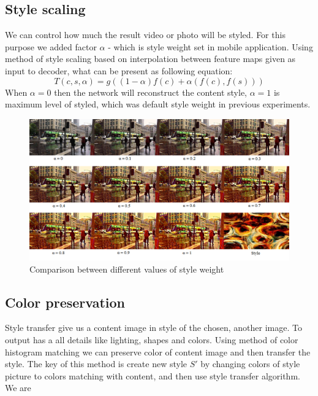 \documentclass[../Main.tex]{subfiles}
\begin{document}
\subsection{Style scaling}
We can control how much the result video or photo will be styled. For this purpose we added factor $\alpha$ -  which is style weight set in mobile application. Using method of style scaling based on interpolation between feature maps given as input to decoder, what can be present as following equation: $$T(c,s,\alpha) = g((1-\alpha)f(c)+\alpha (f(c),f(s)))$$ When $\alpha= 0$  then the network will reconstruct the content style, $\alpha = 1$ is maximum level of styled, which was default style weight in previous experiments. 

\begin{figure}[h!]
    \centering
    \includegraphics[scale=0.75]{Images/style1.png}
    \caption{Comparison between different values of style weight}
    \label{fig:style1}
\end{figure}

\subsection{Color preservation}
Style transfer give us a content image in style of the chosen, another image. To output has a all details like lighting, shapes and colors. Using method of color histogram matching we can preserve color of content image and then transfer the style. The key of this method is create new style $S'$ by changing colors of style picture to colors matching with content, and then use style transfer algorithm. 
We are 
\end{document}

